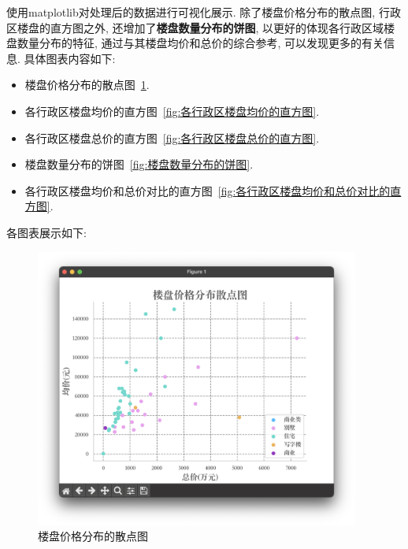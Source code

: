 使用matplotlib对处理后的数据进行可视化展示. 除了楼盘价格分布的散点图,
行政区楼盘的直方图之外, 还增加了\textbf{楼盘数量分布的饼图},
以更好的体现各行政区域楼盘数量分布的特征, 通过与其楼盘均价和总价的综合参考,
可以发现更多的有关信息.
具体图表内容如下:
\begin{itemize}
    \item 楼盘价格分布的散点图~\ref{fig:楼盘价格分布的散点图}.
    \item 各行政区楼盘均价的直方图~\ref{fig:各行政区楼盘均价的直方图}.
    \item 各行政区楼盘总价的直方图~\ref{fig:各行政区楼盘总价的直方图}.
    \item 楼盘数量分布的饼图~\ref{fig:楼盘数量分布的饼图}.
    \item
        各行政区楼盘均价和总价对比的直方图~\ref{fig:各行政区楼盘均价和总价对比的直方图}.
\end{itemize}

各图表展示如下:
\begin{figure}[ht!]
    \begin{center}
        \includegraphics[width=0.95\textwidth]{figures/scatter.png}
    \end{center}
    \caption{楼盘价格分布的散点图}
    \label{fig:楼盘价格分布的散点图}
\end{figure}

